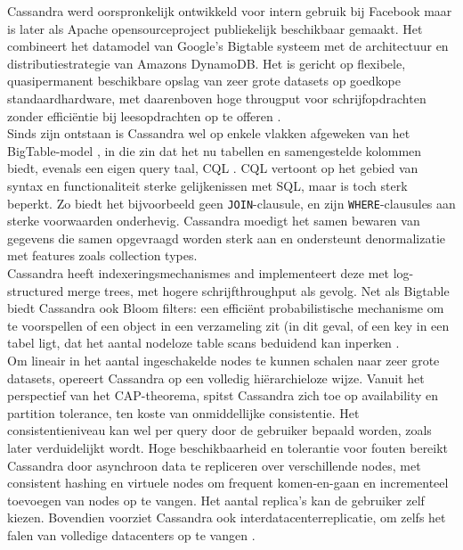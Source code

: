 Cassandra werd oorspronkelijk ontwikkeld voor intern gebruik bij Facebook maar is later als Apache opensourceproject publiekelijk beschikbaar gemaakt. Het combineert het datamodel van Google's Bigtable systeem met de architectuur en distributiestrategie van Amazons DynamoDB. Het is gericht op flexibele, quasipermanent beschikbare opslag van zeer grote datasets op goedkope standaardhardware, met daarenboven hoge througput voor schrijfopdrachten zonder effici\"entie bij leesopdrachten op te offeren \cite{borthakur2011apache}.\\
Sinds zijn ontstaan is Cassandra wel op enkele vlakken afgeweken van het BigTable-model \cite{cassandra_then&now}, in die zin dat het nu tabellen en samengestelde kolommen
biedt, evenals een eigen query taal, CQL \cite{cassandra_CQL}. CQL vertoont op het gebied van syntax en functionaliteit sterke gelijkenissen met SQL, maar is toch sterk beperkt. Zo biedt het bijvoorbeeld geen \texttt{JOIN}-clausule, en zijn \texttt{WHERE}-clausules aan sterke voorwaarden onderhevig. Cassandra moedigt het samen bewaren van gegevens die samen opgevraagd worden sterk aan en ondersteunt denormalizatie met features zoals collection types.\\
Cassandra heeft indexeringsmechanismes and implementeert deze met log-structured merge trees, met hogere schrijfthroughput als gevolg.
Net als Bigtable biedt Cassandra ook Bloom filters: een effici\"ent probabilistische mechanisme om te voorspellen of een object in een verzameling zit (in dit geval, of een key in een tabel ligt, dat het aantal nodeloze table scans beduidend kan inperken \cite{mullin1983second}.\\
Om lineair in het aantal ingeschakelde nodes te kunnen schalen naar zeer grote datasets, opereert Cassandra op een volledig hi\"erarchieloze wijze. Vanuit het perspectief van het CAP-theorema, spitst Cassandra zich toe op availability en partition tolerance, ten koste van onmiddellijke consistentie. Het consistentieniveau kan wel per query door de gebruiker bepaald worden, zoals later verduidelijkt wordt. Hoge beschikbaarheid en tolerantie voor fouten bereikt Cassandra door asynchroon data te repliceren over verschillende nodes, met consistent hashing en virtuele nodes om frequent komen-en-gaan en incrementeel toevoegen van nodes op te vangen. Het aantal replica's kan de gebruiker zelf kiezen. Bovendien voorziet Cassandra ook interdatacenterreplicatie, om zelfs het falen van volledige datacenters op te vangen \cite{decandia2007dynamo} \cite{lakshman2010cassandra} \cite{cassandra_then&now}.\\

